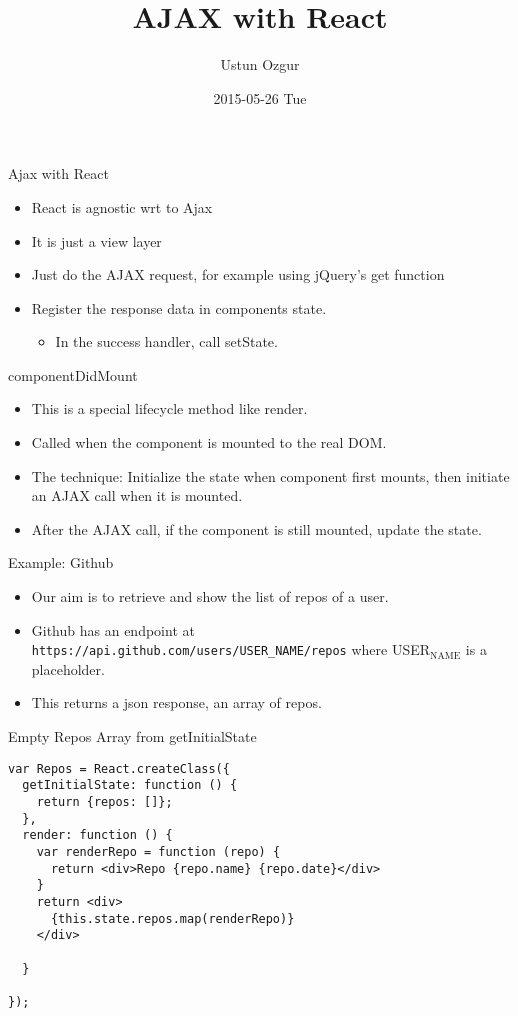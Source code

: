 \documentclass[presentation]{beamer}
\author{Ustun Ozgur}
\date{2015-05-26 Tue}
\title{AJAX with React}
\begin{document}
\maketitle

\begin{frame}[label=sec-1]{Ajax with React}
\begin{itemize}
\item React is agnostic wrt to Ajax
\item It is just a view layer
\item Just do the AJAX request, for example using jQuery's get function
\item Register the response data in components state.
\begin{itemize}
\item In the success handler, call setState.
\end{itemize}
\end{itemize}
\end{frame}

\begin{frame}[label=sec-2]{componentDidMount}
\begin{itemize}
\item This is a special lifecycle method like render.
\item Called when the component is mounted to the real DOM.
\item The technique: Initialize the state when component first mounts, then
initiate an AJAX call when it is mounted.
\item After the AJAX call, if the component is still mounted, update the state.
\end{itemize}
\end{frame}

\begin{frame}[fragile,label=sec-3]{Example: Github}
 \begin{itemize}
\item Our aim is to retrieve and show the list of repos of a user.
\item Github has an endpoint at \texttt{https://api.github.com/users/USER\_NAME/repos} where
USER$_{\text{NAME}}$ is a placeholder.
\item This returns a json response, an array of repos.
\end{itemize}
\end{frame}

\begin{frame}[fragile,label=sec-4]{Empty Repos Array from getInitialState}
 \begin{verbatim}
var Repos = React.createClass({
  getInitialState: function () {
    return {repos: []};
  },
  render: function () {
    var renderRepo = function (repo) {
      return <div>Repo {repo.name} {repo.date}</div>
    }
    return <div>
      {this.state.repos.map(renderRepo)}
    </div>

  }

});
\end{verbatim}
\end{frame}
\end{document}
